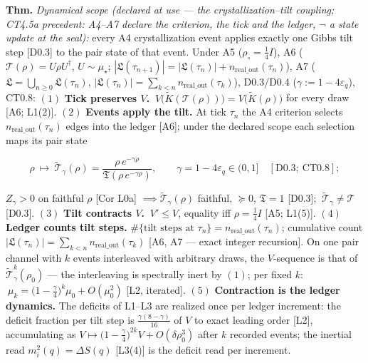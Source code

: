 \begin{theorem}\label{tag:L0}
\textbf{Thm.} \textit{Dynamical scope (declared at use — the crystallization–tilt coupling; CT4.5a precedent: A4–A7 declare the criterion, the tick and the ledger, $\neg$ a state update at the seal):} every A4 crystallization event applies exactly one Gibbs tilt step [D0.3] to the pair state of that event. Under A5 ($\rho_\circ=\tfrac14I$), A6 ($\mathcal T(\rho)=U\rho U^\dagger$, $U\sim\mu_\star$; $|\mathfrak L(\tau_{n+1})|=|\mathfrak L(\tau_n)|+n_{\mathrm{real\_out}}(\tau_n)$), A7 ($\mathfrak L=\bigcup_{n\ge0}\mathfrak L(\tau_n)$, $|\mathfrak L(\tau_n)|=\sum_{k<n}n_{\mathrm{real\_out}}(\tau_k)$), D0.3/D0.4 ($\gamma:=1-4\varepsilon_q$), CT0.8: $(1)$ \textbf{Tick preserves $V$.} $\ V\bigl(\tilde K(\mathcal T(\rho))\bigr)=V\bigl(\tilde K(\rho)\bigr)$ for every draw [A6; L1(2)]. $(2)$ \textbf{Events apply the tilt.} At tick $\tau_n$ the A4 criterion selects $n_{\mathrm{real\_out}}(\tau_n)$ edges into the ledger [A6]; under the declared scope each selection maps its pair state

\[
\rho\ \longmapsto\ \tilde{\mathcal T}_\gamma(\rho)=\frac{\rho\,e^{-\gamma\rho}}{\mathfrak T(\rho\,e^{-\gamma\rho})},\qquad
\gamma=1-4\varepsilon_q\in(0,1]\quad[\mathrm{D0.3};\ \mathrm{CT0.8}];
\]

$Z_\gamma>0$ on faithful $\rho$ [Cor L0a] $\implies\tilde{\mathcal T}_\gamma(\rho)$ faithful, $\succeq0$, $\mathfrak T=1$ [D0.3]; $\ \tilde{\mathcal T}_\gamma\ne\mathcal T$ [D0.3]. $(3)$ \textbf{Tilt contracts $V$.} $\ V'\le V$, equality iff $\rho=\tfrac14I$ [A5; L1(5)]. $(4)$ \textbf{Ledger counts tilt steps.} $\#\{\text{tilt steps at }\tau_n\}=n_{\mathrm{real\_out}}(\tau_n)$; cumulative count $|\mathfrak L(\tau_n)|=\sum_{k<n}n_{\mathrm{real\_out}}(\tau_k)$ [A6, A7 — exact integer recursion]. On one pair channel with $k$ events interleaved with arbitrary draws, the $V$-sequence is that of $\tilde{\mathcal T}_\gamma^{k}(\rho_0)$ — the interleaving is spectrally inert by $(1)$; per fixed $k$: $\ \mu_k=\bigl(1-\tfrac\gamma4\bigr)^{k}\mu_0+O(\mu_0^2)$ [L2, iterated]. $(5)$ \textbf{Contraction is the ledger dynamics.} The deficits of L1–L3 are realized once per ledger increment: the deficit fraction per tilt step is $\tfrac{\gamma(8-\gamma)}{16}$ of $V$ to exact leading order [L2], accumulating as $V\mapsto\bigl(1-\tfrac\gamma4\bigr)^{2k}V+O(\delta\rho_0^3)$ after $k$ recorded events; the inertial read $m_i^2(q)=\Delta S(q)$ [L3(4)] is the deficit read per increment.


\end{theorem}
